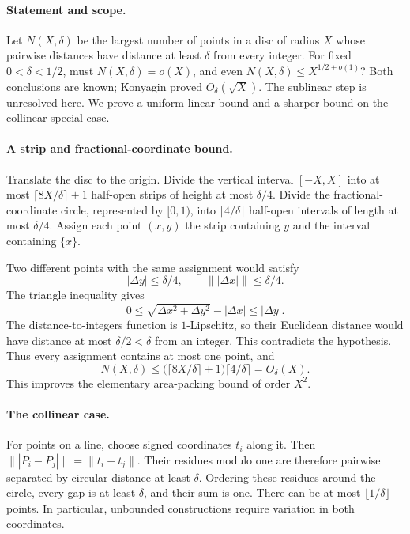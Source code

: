 \paragraph{Statement and scope.}
Let \(N(X,\delta)\) be the largest number of points in a disc of radius
\(X\) whose pairwise distances have distance at least \(\delta\)
from every integer. For fixed \(0<\delta<1/2\), must
\(N(X,\delta)=o(X)\), and even
\(N(X,\delta)\leq X^{1/2+o(1)}\)?
Both conclusions are known; Konyagin proved \(O_\delta(\sqrt X)\).
The sublinear step is unresolved here. We prove a uniform linear
bound and a sharper bound on the collinear special case.

\paragraph{A strip and fractional-coordinate bound.}
Translate the disc to the origin. Divide the vertical interval
\([-X,X]\) into at most \(\lceil8X/\delta\rceil+1\) half-open strips
of height at most \(\delta/4\).
Divide the fractional-coordinate circle, represented by \([0,1)\),
into \(\lceil4/\delta\rceil\) half-open intervals of length at most
\(\delta/4\). Assign each point \((x,y)\) the strip containing \(y\)
and the interval containing \(\{x\}\).

Two different points with the same assignment would satisfy
\[
 |\Delta y|\leq\delta/4,\qquad
 \bigl\||\Delta x|\bigr\|\leq\delta/4.
\]
The triangle inequality gives
\[
 0\leq\sqrt{\Delta x^2+\Delta y^2}-|\Delta x|
 \leq|\Delta y|.
\]
The distance-to-integers function is \(1\)-Lipschitz, so their
Euclidean distance would have distance at most \(\delta/2<\delta\)
from an integer. This contradicts the hypothesis.
Thus every assignment contains at most one point, and
\[
 N(X,\delta)\leq
 \bigl(\lceil8X/\delta\rceil+1\bigr)\lceil4/\delta\rceil
 =O_\delta(X).
 \tag{1}
\]
This improves the elementary area-packing bound of order \(X^2\).

\paragraph{The collinear case.}
For points on a line, choose signed coordinates \(t_i\) along it.
Then
\(\||P_i-P_j|\|=\|t_i-t_j\|\).
Their residues modulo one are therefore pairwise separated by
circular distance at least \(\delta\). Ordering these residues around
the circle, every gap is at least \(\delta\), and their sum is one.
There can be at most \(\lfloor1/\delta\rfloor\) points.
In particular, unbounded constructions require variation in both
coordinates.

